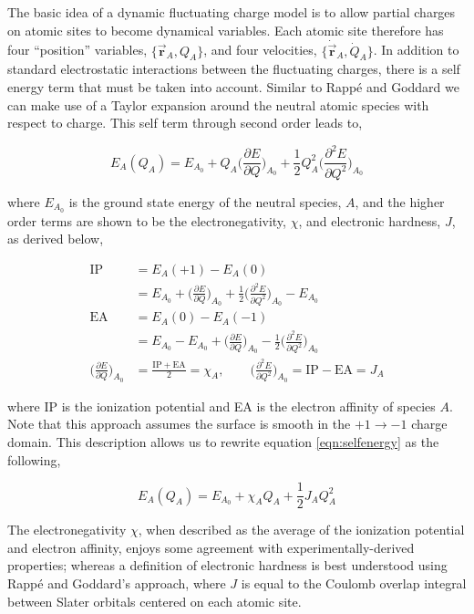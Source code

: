 The basic idea of a dynamic fluctuating charge model is to allow partial
charges on atomic sites to become dynamical variables.  Each atomic site
therefore has four ``position'' variables, $\{\vec{\mathbf{r}}_A, Q_A\}$, and
four velocities, $\{\dot{\vec{\mathbf{r}}}_A, \dot{Q}_A\}$.   In addition to
standard electrostatic interactions between the fluctuating charges, there is a
self energy term that must be taken into account. Similar to Rapp\'e and
Goddard\citep{Rappe:1991dq} we can make use of a Taylor expansion around the
neutral atomic species with respect to charge.  This self term through second
order leads to,

\begin{equation} \label{eqn:selfenergy}
E_A(Q_A) = E_{A_0} + Q_A\bigg( \frac{\partial E}{\partial Q} \bigg )_{A_0} +
\frac{1}{2}Q_A^2 \bigg(\frac{\partial^2E}{\partial Q^2}\bigg)_{A_0}
\end{equation}

where $E_{A_0}$ is the ground state energy of the neutral species, $A$, and the
higher order terms are shown to be the electronegativity, $\chi$, and
electronic hardness, $J$, as derived below,

\begin{align*}
\mathrm{IP} &= E_A(+1) - E_A(0) \\
& = E_{A_0} + \bigg (\frac{\partial E}{\partial Q}\bigg)_{A_0} + \frac{1}{2}\bigg(\frac{\partial^2E}{\partial Q^2}\bigg)_{A_0} - E_{A_0} \\
\mathrm{EA} &= E_A(0) - E_A(-1) \\
& = E_{A_0} - E_{A_0} + \bigg (\frac{\partial E}{\partial Q}\bigg)_{A_0} - \frac{1}{2}\bigg(\frac{\partial^2E}{\partial Q^2}\bigg)_{A_0}  \\
\bigg (\frac{\partial E}{\partial Q}\bigg)_{A_0} &= \frac{\mathrm{IP+EA}}{2} = \chi_A ,\qquad \bigg (\frac{\partial^2 E}{\partial Q^2}\bigg)_{A_0} = \mathrm{IP-EA} = J_A
\end{align*}

where IP is the ionization potential and EA is the electron affinity of species
$A$.  Note that this approach assumes the surface is smooth in the
$+1 \rightarrow -1$ charge domain. This description allows us to rewrite equation
\ref{eqn:selfenergy} as the following,

\begin{equation}
E_A(Q_A) = E_{A_0} + \chi_A Q_A + \frac{1}{2} J_{A} Q_A^2
\label{eq:harmonic}
\end{equation}

The electronegativity $\chi$, when described as the average of the ionization
potential and electron affinity, enjoys some agreement with experimentally-derived properties; whereas a
definition of electronic hardness is best understood using Rapp\'e and
Goddard's approach, where $J$ is equal to the Coulomb overlap integral between
Slater orbitals centered on each atomic site\citep{Rappe:1991dq}.

